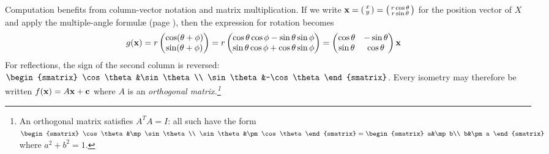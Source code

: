 Computation benefits from column-vector notation and matrix multiplication. If we write ${\mathbf{x}}=\left(\begin{smallmatrix}x\\y\end{smallmatrix}\right) =\left(\begin{smallmatrix}r\cos\theta\\r\sin\theta\end{smallmatrix}\right)$ for the position vector of $X$ and apply the multiple-angle formulæ (page \pageref{sec:multangle}), then the expression for rotation becomes
\begin{align*}
g({\mathbf{x}})&= r\begin{pmatrix}\cos(\theta+\phi)\\\sin(\theta+\phi)\end{pmatrix} =r\begin{pmatrix}\cos\theta\cos\phi-\sin\theta\sin\phi\\\sin\theta\cos\phi+\cos\theta\sin\phi\end{pmatrix} =\begin{pmatrix}
\cos\theta&-\sin\theta\\
\sin\theta&\cos\theta
\end{pmatrix}{\mathbf{x}}
\end{align*}
For reflections, the sign of the second column is reversed: $\begin{smatrix}
\cos\theta&\sin\theta\\
\sin\theta&-\cos\theta
\end{smatrix}$. Every isometry may therefore be written $f({\mathbf{x}})=A{\mathbf{x}}+{\mathbf{c}}$ where $A$ is an \emph{orthogonal matrix.\footnote{An orthogonal matrix satisfies $A^TA=I$: all such have the form $\begin{smatrix}
\cos\theta&\mp\sin\theta\\
\sin\theta&\pm\cos\theta
\end{smatrix}=\begin{smatrix}
a&\mp b\\
b&\pm a
\end{smatrix}$ where $a^2+b^2=1$.}}

